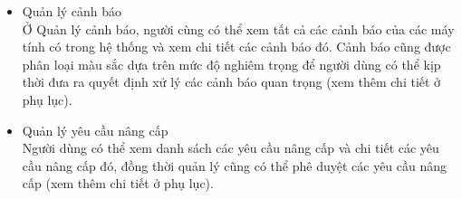 \begin{itemize}
\item{Quản lý cảnh báo}\\
Ở Quản lý cảnh báo, người cùng có thể xem tất cả các cảnh báo của các máy tính có trong hệ thống và xem chi tiết các cảnh báo đó. Cảnh báo cũng được phân loại màu sắc dựa trên mức độ nghiêm trọng để người dùng có thể kịp thời đưa ra quyết định xử lý các cảnh báo quan trọng (xem thêm chi tiết ở phụ lục).

\item{Quản lý yêu cầu nâng cấp}\\
Người dùng có thể xem danh sách các yêu cầu nâng cấp và chi tiết các yêu cầu nâng cấp đó, đồng thời quản lý cũng có thể phê duyệt các yêu cầu nâng cấp (xem thêm chi tiết ở phụ lục).


\end{itemize}
